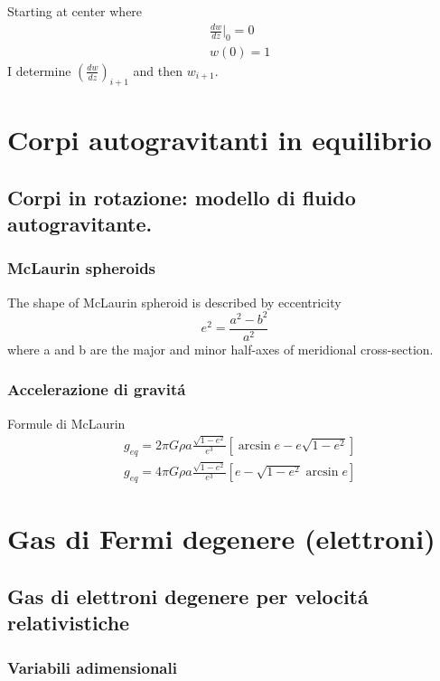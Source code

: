 \documentclass[main.tex]{subfiles}
\begin{document}
 Starting at center where
 \begin{align*}
 &\frac{dw}{dz}|_0=0\\
 &w(0)=1
 \end{align*}
I determine $(\frac{dw}{dz})_{i+1}$ and then $w_{i+1}$.
 
 
\chapter{Corpi autogravitanti in equilibrio}
\PartialToc


\section{Corpi in rotazione: modello di fluido autogravitante.}
 
\subsection{McLaurin spheroids}

The shape of McLaurin spheroid is described by eccentricity
\begin{equation*}
e^2=\frac{a^2-b^2}{a^2}
\end{equation*}
where a and b are the major and minor half-axes of meridional cross-section.
 
\subsection{Accelerazione di gravit\'a}

Formule di McLaurin
\begin{align*}
&g_{eq}=2\pi G\rho a \frac{\sqrt{1-e^2}}{e^3}[\arcsin{e}-e\sqrt{1-e^2}]\\
&g_{eq}=4\pi G\rho a \frac{\sqrt{1-e^2}}{e^3}[e-\sqrt{1-e^2}\arcsin{e}]
\end{align*}

 
\chapter{Gas di Fermi degenere (elettroni)}
\PartialToc


\section{Gas di elettroni degenere per velocit\'a relativistiche}
 
\subsection{Variabili adimensionali}
\end{document}

